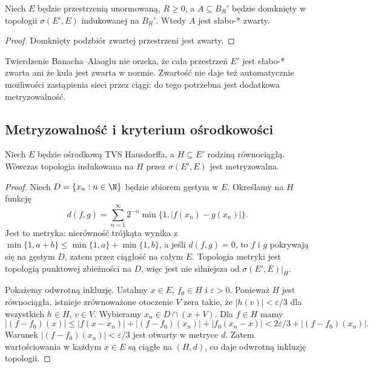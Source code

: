 \begin{wniosek}\label{cor:alaoglu-closed}
Niech $E$ będzie przestrzenią unormowaną, $R\ge0$, a
$A\subseteq B_R'$ będzie domknięty w topologii
$\sigma(E',E)$ indukowanej na $B_R'$. Wtedy $A$ jest
słabo-* zwarty.
\end{wniosek}
\begin{proof}
Domknięty podzbiór zwartej przestrzeni jest zwarty.
\end{proof}

\begin{uwaga}
Twierdzenie Banacha--Alaoglu nie orzeka, że cała przestrzeń $E'$
jest słabo-* zwarta ani że kula jest zwarta w normie.
Zwartość nie daje też automatycznie możliwości zastąpienia
sieci przez ciągi: do tego potrzebna jest dodatkowa metryzowalność.
\end{uwaga}

\subsection{Metryzowalność i kryterium ośrodkowości}

\begin{twierdzenie}
\label{thm:weakstar-metrizable-equicont}
Niech $E$ będzie ośrodkową TVS Hausdorffa, a $H\subseteq E'$
rodziną równociągłą. Wówczas topologia indukowana na $H$
przez $\sigma(E',E)$ jest metryzowalna.
\end{twierdzenie}
\begin{proof}
Niech $D=\{x_n:n\in\N\}$ będzie zbiorem gęstym w $E$.
Określamy na $H$ funkcję
\[
 d(f,g)=\sum_{n=1}^\infty 2^{-n}\min\{1,|f(x_n)-g(x_n)|\}.
\]
Jest to metryka: nierówność trójkąta wynika z
$\min\{1,a+b\}\le\min\{1,a\}+\min\{1,b\}$,
a jeśli $d(f,g)=0$, to $f$ i $g$ pokrywają się na gęstym
$D$, zatem przez ciągłość na całym $E$.
Topologia metryki jest topologią punktowej zbieżności na $D$,
więc jest nie silniejsza od $\sigma(E',E)|_H$.

Pokażemy odwrotną inkluzję. Ustalmy $x\in E$, $f_0\in H$
i $\varepsilon>0$. Ponieważ $H$ jest równociągła,
istnieje zrównoważone otoczenie $V$ zera takie, że
$|h(v)|<\varepsilon/3$ dla wszystkich $h\in H$, $v\in V$.
Wybieramy $x_n\in D\cap(x+V)$. Dla $f\in H$ mamy
\[
 |(f-f_0)(x)|\le |f(x-x_n)|+|(f-f_0)(x_n)|
                      +|f_0(x_n-x)|
 <2\varepsilon/3+|(f-f_0)(x_n)|.
\]
Warunek $|(f-f_0)(x_n)|<\varepsilon/3$ jest otwarty
w metryce $d$. Zatem wartościowania w każdym $x\in E$
są ciągłe na $(H,d)$, co daje odwrotną inkluzję topologii.
\end{proof}

